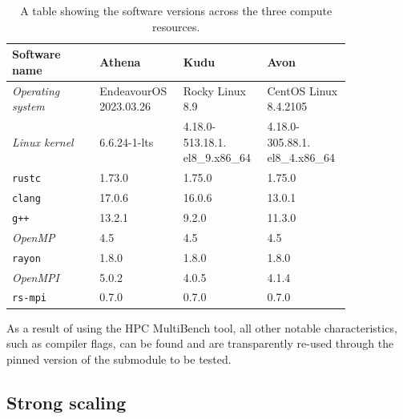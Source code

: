 \begin{table}[H]
    \caption{A table showing the software versions across the three compute resources.}
    \label{table:perfTools}
    \begin{tabular}{|p{0.24\linewidth}||p{0.2\linewidth}|p{0.2\linewidth}|p{0.2\linewidth}|}
    \hline
    \textbf{Software name} & \textbf{Athena} & \textbf{Kudu} & \textbf{Avon} \\
    \hline\hline
    \textit{Operating system} & EndeavourOS 2023.03.26 & Rocky Linux 8.9                & CentOS Linux 8.4.2105          \\\hline
    \textit{Linux kernel}     & 6.6.24-1-lts                     & 4.18.0-513.18.1. el8\_9.x86\_64 & 4.18.0-305.88.1. el8\_4.x86\_64 \\\hline
    \texttt{rustc}            & 1.73.0                           & 1.75.0                         & 1.75.0                         \\\hline
    \texttt{clang}            & 17.0.6                           & 16.0.6                         & 13.0.1                         \\\hline
    \texttt{g++}              & 13.2.1                           & 9.2.0                          & 11.3.0                         \\\hline
    \textit{OpenMP}           & 4.5                              & 4.5                            & 4.5                            \\\hline
    \texttt{rayon}            & 1.8.0                            & 1.8.0                          & 1.8.0                          \\\hline
    \textit{OpenMPI}          & 5.0.2                            & 4.0.5                          & 4.1.4                          \\\hline
    \texttt{rs-mpi}           & 0.7.0                            & 0.7.0                          & 0.7.0                          \\\hline
    \end{tabular}
\end{table}

As a result of using the HPC MultiBench tool, all other notable characteristics, such as compiler flags, can be found and are transparently re-used through the pinned version of the submodule to be tested.

\subsection{Strong scaling}
\label{ssec:strong-scaling}

